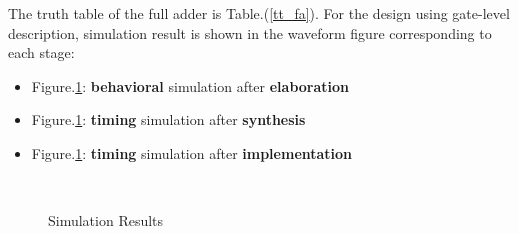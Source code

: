 \documentclass[conference]{IEEEtran}
\begin{document}
The truth table of the full adder is Table.(\ref{tt_fa}). For the design using gate-level description, simulation result is shown in the waveform figure corresponding to each stage:

\begin{itemize}
	\item Figure.\ref{sim_result}: \textbf{behavioral} simulation after \textbf{elaboration}
	\item Figure.\ref{sim_result}: \textbf{timing} simulation after \textbf{synthesis}
	\item Figure.\ref{sim_result}: \textbf{timing} simulation after \textbf{implementation}
\end{itemize}

\begin{figure}[htpb]
	\begin{center}
		\hspace{0.05\columnwidth}
		\\
		\caption{Simulation Results}
		\label{sim_result}
	\end{center}
\end{figure}
\end{document}
